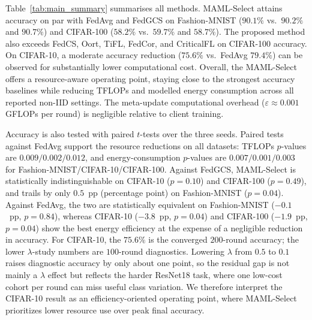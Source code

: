 \documentclass[journal]{IEEEtran}
\newcommand{\revision}[1]{#1}
\begin{document}
\revision{Table~\ref{tab:main_summary} summarises all methods. MAML-Select attains accuracy on par with FedAvg and FedGCS on Fashion-MNIST ($90.1\%$ vs.\ $90.2\%$ and $90.7\%$) and CIFAR-100 ($58.2\%$ vs.\ $59.7\%$ and $58.7\%$). The proposed method also exceeds FedCS, Oort, TiFL, FedCor, and CriticalFL on CIFAR-100 accuracy. On CIFAR-10, a moderate accuracy reduction ($75.6\%$ vs.\ FedAvg $79.4\%$) can be observed for substantially lower computational cost. Overall, the MAML-Select offers a resource-aware operating point, staying close to the strongest accuracy baselines while reducing TFLOPs and modelled energy consumption across all reported non-IID settings. The meta-update computational overhead ($\varepsilon \approx 0.001$ GFLOPs per round) is negligible relative to client training. }

\revision{Accuracy is also tested with paired $t$-tests over the three seeds. Paired tests against FedAvg support the resource reductions on all datasets: TFLOPs $p$-values are $0.009/0.002/0.012$, and energy-consumption $p$-values are $0.007/0.001/0.003$ for Fashion-MNIST/CIFAR-10/CIFAR-100. Against FedGCS, MAML-Select is statistically indistinguishable on CIFAR-10 ($p=0.10$) and CIFAR-100 ($p=0.49$), and trails by only $0.5$~pp (percentage point) on Fashion-MNIST ($p=0.04$). Against FedAvg, the two are statistically equivalent on Fashion-MNIST ($-0.1$~pp, $p=0.84$), whereas CIFAR-10 ($-3.8$~pp, $p=0.04$) and CIFAR-100 ($-1.9$~pp, $p=0.04$) show the best energy efficiency at the expense of a negligible reduction in accuracy. For CIFAR-10, the $75.6\%$ is the converged $200$-round accuracy; the lower $\lambda$-study numbers are $100$-round diagnostics. Lowering $\lambda$ from $0.5$ to $0.1$ raises diagnostic accuracy by only about one point, so the residual gap is not mainly a $\lambda$ effect but reflects the harder ResNet18 task, where one low-cost cohort per round can miss useful class variation. We therefore interpret the CIFAR-10 result as an efficiency-oriented operating point, where MAML-Select prioritizes lower resource use over peak final accuracy.}
\end{document}
